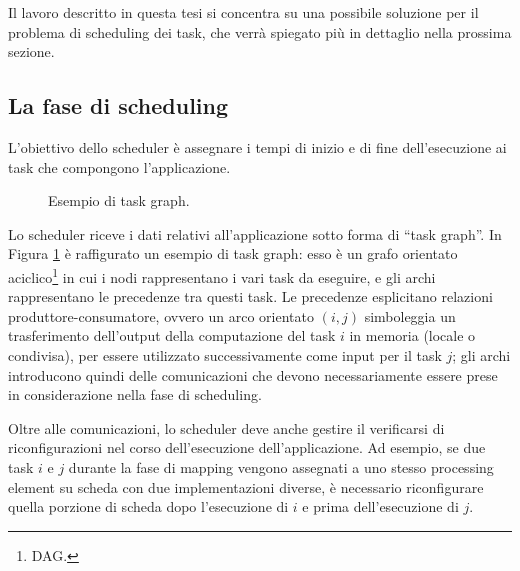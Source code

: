 Il lavoro descritto in questa tesi si concentra su una possibile soluzione per il 
problema di scheduling dei task, che verrà spiegato più in dettaglio nella prossima 
sezione.


\subsection{La fase di scheduling}
L'obiettivo dello scheduler è assegnare i tempi di inizio e di fine dell'esecuzione ai
task che compongono l'applicazione.

\begin{figure}[ht]
\begin{center}
\caption{Esempio di task graph.}
\label{fig:taskGraphExample}
\end{center}
\end{figure}

Lo scheduler riceve i dati relativi all'applicazione sotto forma di ``task graph''.
In Figura \ref{fig:taskGraphExample} è raffigurato un esempio di task graph: esso è un 
grafo orientato aciclico\footnote{\ac{DAG}.} in cui i nodi rappresentano i vari task da 
eseguire, e gli archi rappresentano le precedenze tra questi task.
Le precedenze esplicitano relazioni produttore-consumatore, ovvero un arco orientato 
$(i,j)$ simboleggia un trasferimento dell'output della computazione del task $i$ in 
memoria (locale o condivisa), per essere utilizzato successivamente come input per il 
task $j$; gli archi introducono quindi delle comunicazioni che devono necessariamente 
essere prese in considerazione nella fase di scheduling.

Oltre alle comunicazioni, lo scheduler deve anche gestire il verificarsi di 
riconfigurazioni nel corso dell'esecuzione dell'applicazione. Ad esempio, se due task $i$ 
e $j$ durante la fase di mapping vengono assegnati a uno stesso processing element su 
scheda con due implementazioni diverse, è necessario riconfigurare quella porzione di 
scheda dopo l'esecuzione di $i$ e prima dell'esecuzione di $j$.

